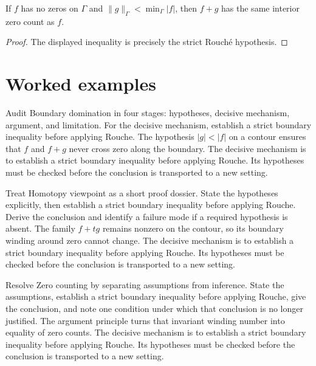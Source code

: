 \begin{theorem}\label{thm:iv13-03}
If $f$ has no zeros on $\Gamma$ and $\|g\|_{\Gamma}<\min_{\Gamma}|f|$, then $f+g$ has the same interior zero count as $f$.
\begin{proof}
The displayed inequality is precisely the strict Rouché hypothesis.
\end{proof}
\end{theorem}

\section{Worked examples}

\begin{example}\label{ex:iv13-worked-01}
Audit Boundary domination in four stages: hypotheses, decisive mechanism, argument, and limitation. For the decisive mechanism, establish a strict boundary inequality before applying Rouche. The hypothesis $|g|<|f|$ on a contour ensures that $f$ and $f+g$ never cross zero along the boundary. The decisive mechanism is to establish a strict boundary inequality before applying Rouche. Its hypotheses must be checked before the conclusion is transported to a new setting.
\end{example}

\begin{example}\label{ex:iv13-worked-02}
Treat Homotopy viewpoint as a short proof dossier. State the hypotheses explicitly, then establish a strict boundary inequality before applying Rouche. Derive the conclusion and identify a failure mode if a required hypothesis is absent. The family $f+t g$ remains nonzero on the contour, so its boundary winding around zero cannot change. The decisive mechanism is to establish a strict boundary inequality before applying Rouche. Its hypotheses must be checked before the conclusion is transported to a new setting.
\end{example}

\begin{example}\label{ex:iv13-worked-03}
Resolve Zero counting by separating assumptions from inference. State the assumptions, establish a strict boundary inequality before applying Rouche, give the conclusion, and note one condition under which that conclusion is no longer justified. The argument principle turns that invariant winding number into equality of zero counts. The decisive mechanism is to establish a strict boundary inequality before applying Rouche. Its hypotheses must be checked before the conclusion is transported to a new setting.
\end{example}

